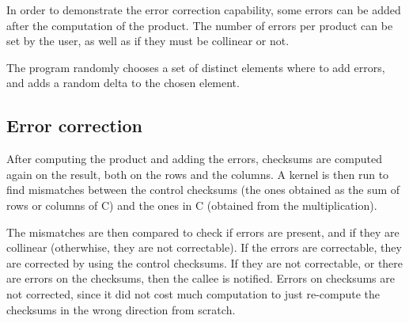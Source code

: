 In order to demonstrate the error correction capability, some errors can be added after the computation of the product.
The number of errors per product can be set by the user, as well as if they must be collinear or not.

The program randomly chooses a set of distinct elements where to add errors, and adds a random delta to the chosen element.

\subsection{Error correction}

After computing the product and adding the errors, checksums are computed again on the result, both on the rows and the columns.
A kernel is then run to find mismatches between the control checksums (the ones obtained as the sum of rows or columns of C) and the ones in C (obtained from the multiplication).

The mismatches are then compared to check if errors are present, and if they are collinear (otherwhise, they are not correctable).
If the errors are correctable, they are corrected by using the control checksums.
If they are not correctable, or there are errors on the checksums, then the callee is notified.
Errors on checksums are not corrected, since it did not cost much computation to just re-compute the checksums in the wrong direction from scratch. 

